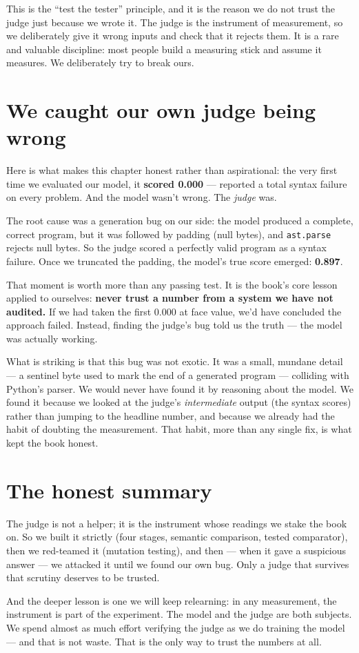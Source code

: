 This is the ``test the tester'' principle, and it is the reason we do
not trust the judge just because we wrote it. The judge is the
instrument of measurement, so we deliberately give it wrong inputs and
check that it rejects them. It is a rare and valuable discipline: most
people build a measuring stick and assume it measures. We deliberately
try to break ours.

\section{We caught our own judge being
wrong}\label{we-caught-our-own-judge-being-wrong}

Here is what makes this chapter honest rather than aspirational: the
very first time we evaluated our model, it \textbf{scored 0.000} ---
reported a total syntax failure on every problem. And the model wasn't
wrong. The \emph{judge} was.

The root cause was a generation bug on our side: the model produced a
complete, correct program, but it was followed by padding (null bytes),
and \texttt{ast.parse} rejects null bytes. So the judge scored a
perfectly valid program as a syntax failure. Once we truncated the
padding, the model's true score emerged: \textbf{0.897}.

That moment is worth more than any passing test. It is the book's core
lesson applied to ourselves: \textbf{never trust a number from a system
we have not audited.} If we had taken the first 0.000 at face value,
we'd have concluded the approach failed. Instead, finding the judge's
bug told us the truth --- the model was actually working.

What is striking is that this bug was not exotic. It was a small,
mundane detail --- a sentinel byte used to mark the end of a generated
program --- colliding with Python's parser. We would never have found it
by reasoning about the model. We found it because we looked at the
judge's \emph{intermediate} output (the syntax scores) rather than
jumping to the headline number, and because we already had the habit of
doubting the measurement. That habit, more than any single fix, is what
kept the book honest.

\section{The honest summary}\label{the-honest-summary}

The judge is not a helper; it is the instrument whose readings we stake
the book on. So we built it strictly (four stages, semantic comparison,
tested comparator), then we red-teamed it (mutation testing), and then
--- when it gave a suspicious answer --- we attacked it until we found
our own bug. Only a judge that survives that scrutiny deserves to be
trusted.

And the deeper lesson is one we will keep relearning: in any
measurement, the instrument is part of the experiment. The model and the
judge are both subjects. We spend almost as much effort verifying the
judge as we do training the model --- and that is not waste. That is the
only way to trust the numbers at all.
